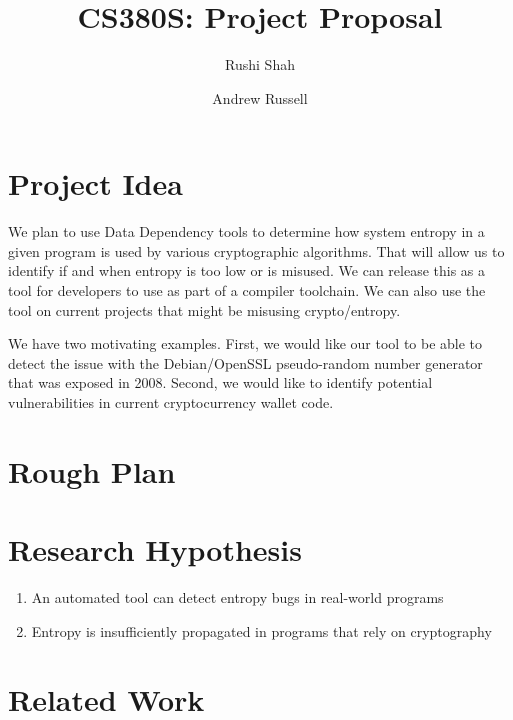 \documentclass[letterpaper,twocolumn,10pt]{article}
\begin{document}
\date{}

\title{\Large \bf CS380S: Project Proposal}

\author{
{\rm Rushi Shah}
\and
{\rm Andrew Russell}
}

\maketitle

\section{Project Idea}

We plan to use Data Dependency tools to determine how system entropy in a given program is used by various cryptographic algorithms. That will allow us to identify if and when entropy is too low or is misused. We can release this as a tool for developers to use as part of a compiler toolchain. We can also use the tool on current projects that might be misusing crypto/entropy. 

We have two motivating examples. First, we would like our tool to be able to detect the issue with the Debian/OpenSSL pseudo-random number generator that was exposed in 2008. Second, we would like to identify potential vulnerabilities in current cryptocurrency wallet code. 

\section{Rough Plan}


\section{Research Hypothesis}

\begin{enumerate}
	\item An automated tool can detect entropy bugs in real-world programs 
	\item Entropy is insufficiently propagated in programs that rely on cryptography
\end{enumerate}

\section{Related Work}
\end{document}
